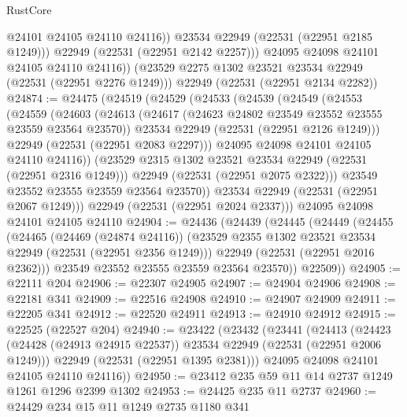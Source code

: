 \begin{lexlean}{RustCore}
\begin{coremodule}
                @24101
                @24105
                @24110
                @24116))
            @23534
            @22949
            (@22531 (@22951 @2185 @1249)))
          @22949
          (@22531 (@22951 @2142 @2257)))
        @24095
        @24098
        @24101
        @24105
        @24110
        @24116))
    (@23529 @2275 @1302 @23521 @23534 @22949 (@22531 (@22951 @2276 @1249)))
    @22949
    (@22531 (@22951 @2134 @2282))
@24874 := @24475
    (@24519
      (@24529
        (@24533
          (@24539
            (@24549
              (@24553
                (@24559
                  (@24603
                    (@24613
                      (@24617 (@24623 @24802 @23549 @23552 @23555 @23559 @23564 @23570))
                      @23534
                      @22949
                      (@22531 (@22951 @2126 @1249)))
                    @22949
                    (@22531 (@22951 @2083 @2297)))
                  @24095
                  @24098
                  @24101
                  @24105
                  @24110
                  @24116))
              (@23529 @2315 @1302 @23521 @23534 @22949 (@22531 (@22951 @2316 @1249)))
              @22949
              (@22531 (@22951 @2075 @2322)))
            @23549
            @23552
            @23555
            @23559
            @23564
            @23570))
        @23534
        @22949
        (@22531 (@22951 @2067 @1249)))
      @22949
      (@22531 (@22951 @2024 @2337)))
    @24095
    @24098
    @24101
    @24105
    @24110
@24904 := @24436
    (@24439
      (@24445
        (@24449
          (@24455
            (@24465
              (@24469 (@24874 @24116))
              (@23529 @2355 @1302 @23521 @23534 @22949 (@22531 (@22951 @2356 @1249)))
              @22949
              (@22531 (@22951 @2016 @2362)))
            @23549
            @23552
            @23555
            @23559
            @23564
            @23570))
        @22509))
@24905 := @22111 @204
@24906 := @22307 @24905
@24907 := @24904 @24906
@24908 := @22181 @341
@24909 := @22516 @24908
@24910 := @24907 @24909
@24911 := @22205 @341
@24912 := @22520 @24911
@24913 := @24910 @24912
@24915 := @22525 (@22527 @204)
@24940 := @23422
    (@23432
      (@23441
        (@24413
          (@24423 (@24428 (@24913 @24915 @22537)) @23534 @22949 (@22531 (@22951 @2006 @1249)))
          @22949
          (@22531 (@22951 @1395 @2381)))
        @24095
        @24098
        @24101
        @24105
        @24110
        @24116))
@24950 := @23412 @235 @59 @11 @14 @2737 @1249 @1261 @1296 @2399 @1302
@24953 := @24425 @235 @11 @2737
@24960 := @24429 @234 @15 @11 @1249 @2735 @1180 @341

\end{coremodule}
\end{lexlean}

